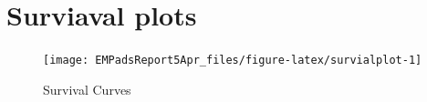 \documentclass[nofonts,]{tufte-book}
\begin{document}
\hypertarget{surviaval-plots}{%
\chapter{Surviaval plots}\label{surviaval-plots}}

\begin{figure}

{\centering \texttt{[image: EMPadsReport5Apr\_files/figure-latex/survialplot-1]} 

}

\caption[Survival Curves]{Survival Curves}\label{fig:survialplot}
\end{figure}


\end{document}
